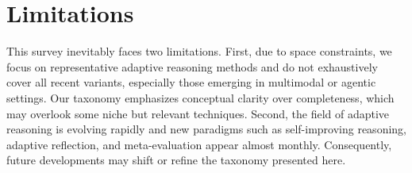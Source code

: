 \documentclass[11pt]{article}
\newtheorem{definition}{Definition}[section]
\begin{document}
\section{Limitations}
This survey inevitably faces two limitations.
First, due to space constraints, we focus on representative adaptive reasoning methods and do not exhaustively cover all recent variants, especially those emerging in multimodal or agentic settings. Our taxonomy emphasizes conceptual clarity over completeness, which may overlook some niche but relevant techniques.
Second, the field of adaptive reasoning is evolving rapidly and new paradigms such as self-improving reasoning, adaptive reflection, and meta-evaluation appear almost monthly. Consequently, future developments may shift or refine the taxonomy presented here.



\end{document}

